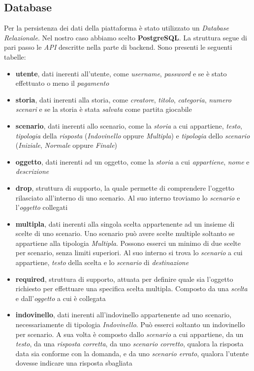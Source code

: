 \documentclass{article}
\begin{document}
\subsection{Database}
Per la persistenza dei dati della piattaforma è stato utilizzato un \textit{Database Relazionale}. Nel nostro caso abbiamo scelto \textbf{PostgreSQL}. La struttura segue di pari passo le \textit{API} descritte nella parte di backend.  Sono presenti le seguenti tabelle:
\begin{itemize}[label = {-}]
    \itemsep0em
    \item \textbf{utente}, dati inerenti all'utente, come \textit{username}, \textit{password} e se è stato effettuato o meno il \textit{pagamento}
    \item \textbf{storia}, dati inerenti alla storia, come \textit{creatore}, \textit{titolo}, \textit{categoria}, \textit{numero scenari} e se la storia è stata \textit{salvata} come partita giocabile
    \item \textbf{scenario}, dati inerenti allo scenario, come la \textit{storia} a cui appartiene, \textit{testo}, \textit{tipologia} della \textit{risposta} (\textit{Indovinello} oppure \textit{Multipla}) e \textit{tipologia} dello \textit{scenario} (\textit{Iniziale}, \textit{Normale} oppure \textit{Finale})
    \item \textbf{oggetto}, dati inerenti ad un oggetto, come la \textit{storia} a cui \textit{appartiene}, \textit{nome} e \textit{descrizione}
    \item \textbf{drop}, struttura di supporto, la quale permette di comprendere l’oggetto rilasciato all’interno di uno scenario. Al suo interno troviamo lo \textit{scenario} e l'\textit{oggetto} collegati
    \item \textbf{multipla}, dati inerenti alla singola scelta appartenente ad un insieme di scelte di uno scenario. Uno scenario può avere scelte multiple soltanto se appartiene alla tipologia \textit{Multipla}. Possono esserci un minimo di due scelte per scenario, senza limiti superiori. Al suo interno si trova lo \textit{scenario} a cui appartiene, \textit{testo} della scelta e lo \textit{scenario} di \textit{destinazione}
    \item \textbf{required}, struttura di supporto, attuata per definire quale sia l'oggetto richiesto per effettuare una specifica scelta multipla. Composto da una \textit{scelta} e dall'\textit{oggetto} a cui è collegata
    \item \textbf{indovinello}, dati inerenti all'indovinello appartenente ad uno scenario, necessariamente di tipologia \textit{Indovinello}. Può esserci soltanto un indovinello per scenario. A sua volta è composto dallo \textit{scenario} a cui appartiene, da un \textit{testo}, da una \textit{risposta corretta}, da uno \textit{scenario corretto}, qualora la risposta data sia conforme con la domanda, e da uno \textit{scenario errato}, qualora l'utente dovesse indicare una risposta sbagliata

\end{itemize}
\end{document}
